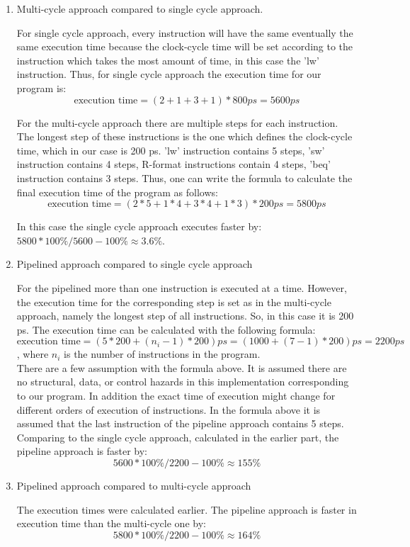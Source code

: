 \documentclass[a4paper]{article}
\begin{document}
\begin{enumerate}[label=(\alph*)]
	\item Multi-cycle approach compared to single cycle approach.
	
	For single cycle approach, every instruction will have the same eventually the same execution time because the clock-cycle time will be set according to the instruction which takes the most amount of time, in this case the 'lw' instruction. Thus, for single cycle approach the execution time for our program is:
	$$\text{execution time} = (2 + 1 + 3 + 1) * 800 ps = 5600 ps  $$
	
	
	For the multi-cycle approach there are multiple steps for each instruction. The longest step of these instructions is the one which defines the clock-cycle time, which in our case is 200 ps. 'lw' instruction contains 5 steps, 'sw' instruction contains 4 steps, R-format instructions contain 4 steps, 'beq' instruction contains 3 steps. Thus, one can write the formula to calculate the final execution time of the program as follows:
	$$\text{execution time} = (2 * 5  + 1 * 4 + 3 * 4 + 1 * 3 ) * 200 ps = 5800 ps$$
	
	In this case the single cycle approach executes faster by: $5800 * 100\% / 5600 - 100\% \approx 3.6\%$.
	
	\item Pipelined approach compared to single cycle approach
	
	For the pipelined more than one instruction is executed at a time. However, the execution time for the corresponding step is set as in the multi-cycle approach, namely the longest step of all instructions. So, in this case it is 200 ps. The execution time can be calculated with the following formula:
	$$\text{execution time} = (5*200 + (n_i-1) * 200) ps = (1000 + (7 - 1) * 200) ps = 2200 ps$$
	, where $n_i$ is the number of instructions in the program. \\
	
	There are a few assumption with the formula above. It is assumed there are no structural, data, or control hazards in this implementation corresponding to our program. In addition the exact time of execution might change for different orders of execution of instructions. In the formula above it is assumed that the last instruction of the pipeline approach contains 5 steps.\\
	
	Comparing to the single cycle approach, calculated in the earlier part, the pipeline approach is faster by: $$5600 * 100\% / 2200 - 100\% \approx 155 \%$$
	
	\item Pipelined approach compared to multi-cycle approach

	The execution times were calculated earlier.	
	The pipeline approach is faster in execution time than the multi-cycle one by:
	$$5800 * 100\%/ 2200 - 100\% \approx 164\%$$
	
	
\end{enumerate}
\end{document}
